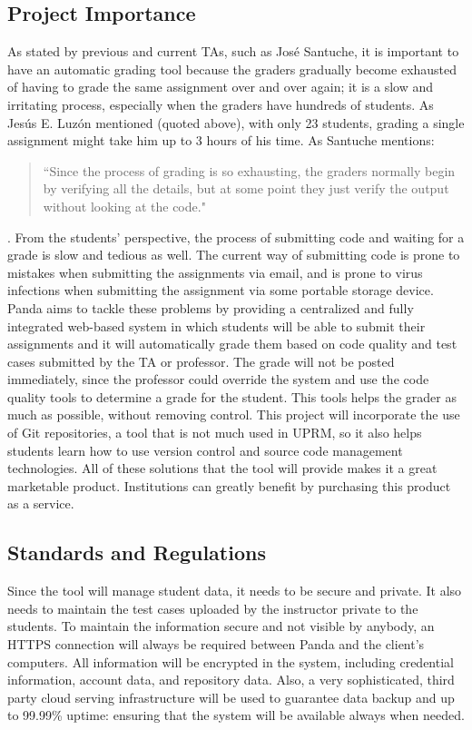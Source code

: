 \subsection{Project Importance}

As stated by previous and current TAs, such as José Santuche, it is important to
have an automatic grading tool because the graders gradually become exhausted of
having to grade the same assignment over and over again; it is a slow and
irritating process, especially when the graders have hundreds of students. As
Jesús E. Luzón mentioned (quoted above), with only 23 students, grading a single
assignment might take him up to 3 hours of his time. As Santuche mentions:
\begin{quote} ``Since the process of grading is so exhausting, the graders
normally begin by verifying all the details, but at some point they just verify
the output without looking at the code." \end{quote}. From the students'
perspective, the process of submitting code and waiting for a grade is slow and
tedious as well. The current way of submitting code is prone to mistakes when
submitting the assignments via email, and is prone to virus infections when
submitting the assignment via some portable storage device. %
Panda aims to tackle
these problems by providing a centralized and fully integrated web-based system
in which students will be able to submit their assignments and it will
automatically grade them based on code quality and test cases submitted by the
TA or professor. The grade will not be posted immediately, since the professor could override the system and use the code quality
tools to determine a grade for the student. This tools helps the grader as much
as possible, without removing control. This project will incorporate the use of
Git repositories, a tool that is not much used in UPRM, so it also helps students
learn how to use version control and source code management technologies. All of
these solutions that the tool will provide makes it a great marketable product.
Institutions can greatly benefit by purchasing this product as a service.

\subsection{Standards and Regulations}
Since the tool will manage student data, it needs to be secure and private. It
also needs to maintain the test cases uploaded by the instructor private to the
students. To maintain the information secure and not visible by anybody, an
HTTPS connection will always be required between Panda and the client's
computers. All information will be encrypted in the system, including credential
information, account data, and repository data. Also, a very sophisticated,
third party cloud serving infrastructure will be used to guarantee data backup
and up to 99.99\% uptime: ensuring that the system will be available always when
needed.
